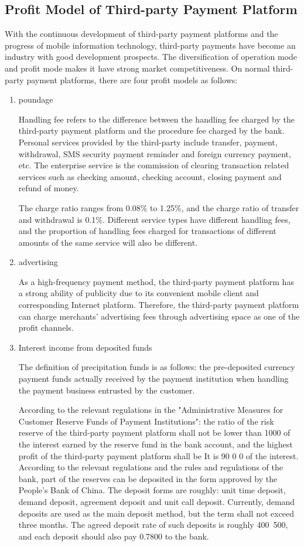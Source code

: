 \documentclass[../mcmpaper]{subfiles}
\begin{document}
\subsection{Profit Model of Third-party Payment Platform}
With the continuous development of third-party payment platforms and the progress of mobile information technology, third-party payments have become an industry with good development prospects. The diversification of operation mode and profit mode makes it have strong market competitiveness. On normal third-party payment platforms, there are four profit models as follows:
\begin{enumerate}[label=\arabic*), itemindent=2\parindent, leftmargin=0pt, topsep=0pt, listparindent=\parindent, itemsep=1pt]
	\item poundage\par
Handling fee refers to the difference between the handling fee charged by the third-party payment platform and the procedure fee charged by the bank. Personal services provided by the third-party include transfer, payment, withdrawal, SMS security payment reminder and foreign currency payment, etc. The enterprise service is the commission of clearing transaction related services such as checking amount, checking account, closing payment and refund of money.
\par
The charge ratio ranges from 0.08\% to 1.25\%, and the charge ratio of transfer and withdrawal is 0.1\%. Different service types have different handling fees, and the proportion of handling fees charged for transactions of different amounts of the same service will also be different.
	\item advertising\par
As a high-frequency payment method, the third-party payment platform has a strong ability of publicity due to its convenient mobile client and corresponding Internet platform. Therefore, the third-party payment platform can charge merchants' advertising fees through advertising space as one of the profit channels.
	\item Interest income from deposited funds\par
The definition of precipitation funds is as follows: the pre-deposited currency payment funds actually received by the payment institution when handling the payment business entrusted by the customer.
\par
According to the relevant regulations in the "Administrative Measures for Customer Reserve Funds of Payment Institutions": the ratio of the risk reserve of the third-party payment platform shall not be lower than 1000 of the interest earned by the reserve fund in the bank account, and the highest profit of the third-party payment platform shall be It is 90 0 0 of the interest. According to the relevant regulations and the rules and regulations of the bank, part of the reserves can be deposited in the form approved by the People's Bank of China. The deposit forms are roughly: unit time deposit, demand deposit, agreement deposit and unit call deposit. Currently, demand deposits are used as the main deposit method, but the term shall not exceed three months. The agreed deposit rate of such deposits is roughly 400~500, and each deposit should also pay 0.7800 to the bank.

\end{enumerate}
\end{document}
